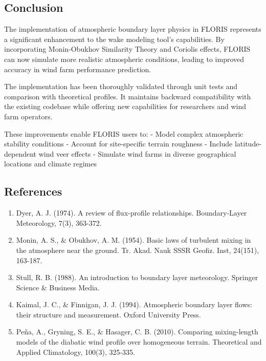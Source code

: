 \documentclass{article}
\begin{document}
\hypertarget{conclusion}{%
\subsection{Conclusion}\label{conclusion}}

The implementation of atmospheric boundary layer physics in FLORIS
represents a significant enhancement to the wake modeling tool's
capabilities. By incorporating Monin-Obukhov Similarity Theory and
Coriolis effects, FLORIS can now simulate more realistic atmospheric
conditions, leading to improved accuracy in wind farm performance
prediction.

The implementation has been thoroughly validated through unit tests and
comparison with theoretical profiles. It maintains backward
compatibility with the existing codebase while offering new capabilities
for researchers and wind farm operators.

These improvements enable FLORIS users to: - Model complex atmospheric
stability conditions - Account for site-specific terrain roughness -
Include latitude-dependent wind veer effects - Simulate wind farms in
diverse geographical locations and climate regimes

\hypertarget{references}{%
\subsection{References}\label{references}}

\begin{enumerate}[label=\arabic*.]
\item
  Dyer, A. J. (1974). A review of flux-profile relationships.
  Boundary-Layer Meteorology, 7(3), 363-372.
\item
  Monin, A. S., \& Obukhov, A. M. (1954). Basic laws of turbulent mixing
  in the atmosphere near the ground. Tr. Akad. Nauk SSSR Geofiz. Inst,
  24(151), 163-187.
\item
  Stull, R. B. (1988). An introduction to boundary layer meteorology.
  Springer Science \& Business Media.
\item
  Kaimal, J. C., \& Finnigan, J. J. (1994). Atmospheric boundary layer
  flows: their structure and measurement. Oxford University Press.
\item
  Peña, A., Gryning, S. E., \& Hasager, C. B. (2010). Comparing
  mixing-length models of the diabatic wind profile over homogeneous
  terrain. Theoretical and Applied Climatology, 100(3), 325-335.
\end{enumerate}
\end{document}
